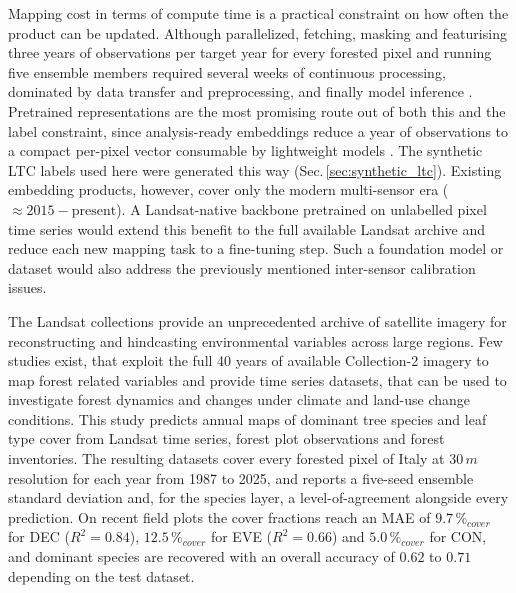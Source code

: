 \documentclass[essd, manuscript]{copernicus}
\begin{document}
Mapping cost in terms of compute time is a practical constraint on how often the product can be updated. Although parallelized, fetching, masking and featurising three years of observations per target year for every forested pixel and running five ensemble members required several weeks of continuous processing, dominated by data transfer and preprocessing, and finally model inference \citep{gorelick_google_2017, frantz_force_2019}. Pretrained representations are the most promising route out of both this and the label constraint, since analysis-ready embeddings reduce a year of observations to a compact per-pixel vector consumable by lightweight models \citep{brown_alphaearth_2025, feng_tessera_2026, ball_geospatial_2026, hiebl_combining_2026}. The synthetic LTC labels used here were generated this way (Sec.\,\ref{sec:synthetic_ltc}). Existing embedding products, however, cover only the modern multi-sensor era ($\approx2015-\text{present}$). A Landsat-native backbone pretrained on unlabelled pixel time series \citep{tseng_lightweight_2024, stewart_torchgeo_2025} would extend this benefit to the full available Landsat archive and reduce each new mapping task to a fine-tuning step. Such a foundation model or dataset would also address the previously mentioned inter-sensor calibration issues.

\conclusions  %

The Landsat collections provide an unprecedented archive of satellite imagery for reconstructing and hindcasting environmental variables across large regions. Few studies exist, that exploit the full 40 years of available Collection-2 imagery to map forest related variables and provide time series datasets, that can be used to investigate forest dynamics and changes under climate and land-use change conditions. This study predicts annual maps of dominant tree species and leaf type cover from Landsat time series, forest plot observations and forest inventories. The resulting datasets cover every forested pixel of Italy at $30\,\unit{m}$ resolution for each year from 1987 to 2025, and reports a five-seed ensemble standard deviation and, for the species layer, a level-of-agreement alongside every prediction. On recent field plots the cover fractions reach an MAE of $9.7\,\%_{cover}$ for DEC ($R^2=0.84$), $12.5\,\%_{cover}$ for EVE ($R^2=0.66$) and $5.0\,\%_{cover}$ for CON, and dominant species are recovered with an overall accuracy of $0.62$ to $0.71$ depending on the test dataset.
\end{document}
